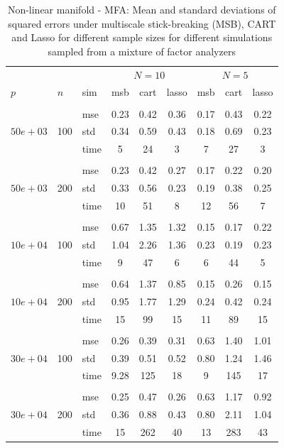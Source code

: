 \documentclass{article} %
\begin{document}
\begin{table}[t]
\caption{Non-linear manifold - MFA: Mean and standard deviations of squared errors under multiscale stick-breaking (MSB), CART and Lasso for different sample sizes for different simulations sampled from a mixture of factor analyzers}\label{table:mfa}
\vskip 0.15in
\begin{center}
\begin{small}
\begin{sc}
\begin{tabular}{lllcccccc}
\hline
&&&\multicolumn{3}{c}{$N=10$}&\multicolumn{3}{c}{$N=5$}\\
$p$&$n$& sim& msb&cart&lasso & msb&cart&lasso\\
\\
\multirow{3}{*}{$50e+03$}&\multirow{3}{*}{100}&mse&0.23&0.42&0.36&0.17&0.43&0.22\\
&&std & 0.34 &0.59&0.43&0.18&0.69&0.23\\
&&time &5&24 & 3&7&27&3\\

\\
\multirow{3}{*}{$50e+03$}&\multirow{3}{*}{200}&mse&0.23 &0.42 &0.27&0.17&0.22&0.20\\
&&std & 0.33& 0.56&0.23&0.19&0.38&0.25\\
&&time & 10 &51&8&12&56&7\\

\\
\multirow{3}{*}{$10e+04$}&\multirow{3}{*}{100}&mse&0.67&1.35&1.32&0.15&0.17&0.22\\
&&std & 1.04&2.26&1.36&0.23&0.19&0.23\\
&&time &9&47&6&6&44&5\\

\\
\multirow{3}{*}{$10e+04$}&\multirow{3}{*}{200}&mse&0.64&1.37&0.85&0.15&0.26&0.15\\
&&std &0.95 &1.77&1.29&0.24&0.42&0.24\\
&&time &15&99&15&11&89&15\\
\\
\multirow{3}{*}{$30e+04$}&\multirow{3}{*}{100}&mse& 0.26&0.39&0.31&0.63&1.40&1.01\\
&&std &0.39&0.51&0.52&0.80 &1.24& 1.46 \\
&&time &9.28&125&18&9 &145& 17\\
\\
\multirow{3}{*}{$30e+04$}&\multirow{3}{*}{200}&mse&0.25&0.47&0.26&0.63&1.17&0.92\\
&&std &0.36&0.88&0.43 & 0.80&2.11&1.04 \\
&&time &15&262&40&13&283&43\\



\end{tabular}
\end{sc}
\end{small}
\end{center}
\end{table}
\end{document}
